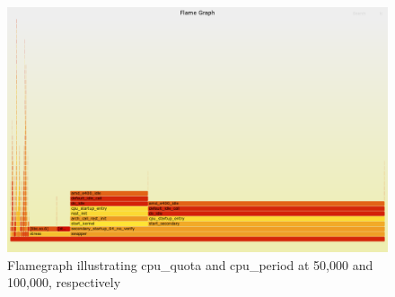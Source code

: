 \documentclass{report}  %
\begin{document}
\begin{figure}[H]
    \centering
    \includegraphics[scale=0.2]{cpu_tricks/6.1.0/V2/flamegraph_20241021_100156.png}
    \caption{Flamegraph illustrating cpu\_quota and cpu\_period at 50,000 and 100,000, respectively}
    \label{fig:flamegraph}
\end{figure}
\end{document}
